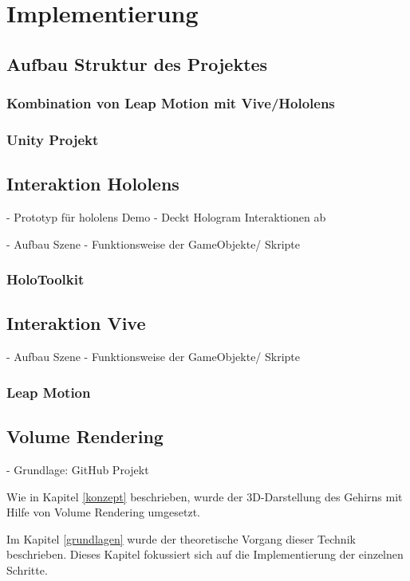 
\chapter{Implementierung}
\label{implementierung}

\section{Aufbau Struktur des Projektes}

\subsection{Kombination von Leap Motion mit Vive/Hololens}
\subsection{Unity Projekt}

\section{Interaktion Hololens}
- Prototyp für hololens Demo
- Deckt Hologram Interaktionen ab

- Aufbau Szene
- Funktionsweise der GameObjekte/ Skripte
\subsection{HoloToolkit}

\section{Interaktion Vive}
\label{3dscene}

- Aufbau Szene
- Funktionsweise der GameObjekte/ Skripte

\subsection{Leap Motion}

\section{Volume Rendering}
- Grundlage: GitHub Projekt

Wie in Kapitel \ref{konzept} beschrieben, wurde der 3D-Darstellung des Gehirns mit Hilfe von Volume Rendering umgesetzt. 

Im Kapitel \ref{grundlagen} wurde der theoretische Vorgang dieser Technik beschrieben. Dieses Kapitel fokussiert sich auf die Implementierung der einzelnen Schritte.

